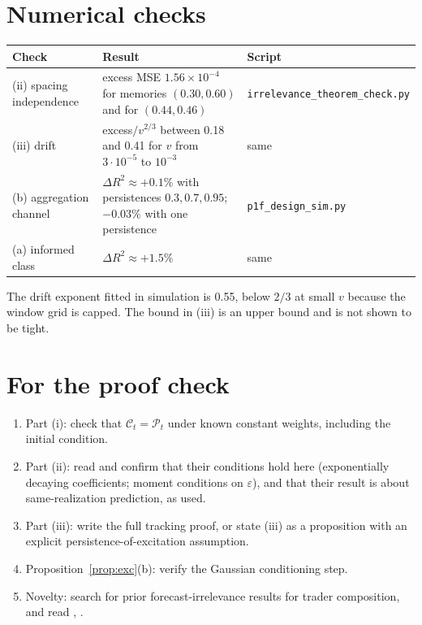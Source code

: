 \documentclass[11pt]{article}
\theoremstyle{remark}\newtheorem{remark}[theorem]{Remark}
\begin{document}
\section{Numerical checks}
\begin{center}\small
\begin{tabular}{p{1.2in}p{2.5in}p{1.2in}}\toprule
Check & Result & Script \\\midrule
(ii) spacing independence & excess MSE $1.56\times10^{-4}$ for memories $(0.30,0.60)$ and for $(0.44,0.46)$ & \texttt{irrelevance\_\allowbreak theorem\_check.py}\\
(iii) drift & excess$/v^{2/3}$ between 0.18 and 0.41 for $v$ from $3\cdot10^{-5}$ to $10^{-3}$ & same\\
(b) aggregation channel & $\Delta R^2\approx+0.1\%$ with persistences $0.3,0.7,0.95$; $-0.03\%$ with one persistence & \texttt{p1f\_design\_\allowbreak sim.py}\\
(a) informed class & $\Delta R^2\approx+1.5\%$ & same\\\bottomrule
\end{tabular}\end{center}
The drift exponent fitted in simulation is 0.55, below $2/3$ at small $v$ because the window grid is capped. The bound in (iii) is an upper bound and is not shown to be tight.

\section{For the proof check}
\begin{enumerate}[itemsep=1pt]
\item Part (i): check that $\mathcal C_t=\mathcal P_t$ under known constant weights, including the initial condition.
\item Part (ii): read \citet{ingwei2003} and confirm that their conditions hold here (exponentially decaying coefficients; moment conditions on $\varepsilon$), and that their result is about same-realization prediction, as used.
\item Part (iii): write the full tracking proof, or state (iii) as a proposition with an explicit persistence-of-excitation assumption.
\item Proposition~\ref{prop:exc}(b): verify the Gaussian conditioning step.
\item Novelty: search for prior forecast-irrelevance results for trader composition, and read \citet{gorman1953}, \citet{sandersetal2009}.
\end{enumerate}
\end{document}
